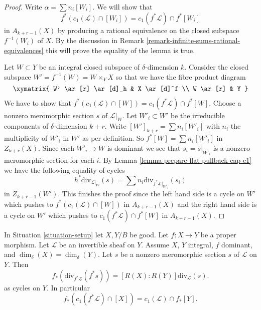\begin{proof}
Write $\alpha = \sum n_i[W_i]$. We will show that
$$
f^*(c_1(\mathcal{L}) \cap [W_i]) = c_1(f^*\mathcal{L}) \cap f^*[W_i]
$$
in $A_{k + r - 1}(X)$ by producing a rational equivalence
on the closed subspace $f^{-1}(W_i)$ of $X$.
By the discussion in
Remark \ref{remark-infinite-sums-rational-equivalences}
this will prove the equality of the lemma is true.

\medskip\noindent
Let $W \subset Y$ be an integral closed subspace of $\delta$-dimension $k$.
Consider the closed subspace $W' = f^{-1}(W) = W \times_Y X$
so that we have the fibre product diagram
$$
\xymatrix{
W' \ar[r] \ar[d]_h & X \ar[d]^f \\
W \ar[r] & Y
}
$$
We have to show that
$f^*(c_1(\mathcal{L}) \cap [W]) = c_1(f^*\mathcal{L}) \cap f^*[W]$.
Choose a nonzero meromorphic section $s$ of $\mathcal{L}|_W$.
Let $W'_i \subset W'$ be the irreducible components of
$\delta$-dimension $k + r$. Write $[W']_{k + r} = \sum n_i[W'_i]$
with $n_i$ the multiplicity of $W'_i$ in $W'$ as per definition.
So $f^*[W] = \sum n_i[W'_i]$ in $Z_{k + r}(X)$.
Since each $W'_i \to W$ is dominant we
see that $s_i = s|_{W'_i}$ is a nonzero meromorphic section for
each $i$. By Lemma \ref{lemma-prepare-flat-pullback-cap-c1}
we have the following equality of cycles
$$
h^*\text{div}_{\mathcal{L}|_W}(s) =
\sum n_i\text{div}_{f^*\mathcal{L}|_{W'_i}}(s_i)
$$
in $Z_{k + r - 1}(W')$. This finishes the proof since
the left hand side is a cycle on $W'$ which pushes to
$f^*(c_1(\mathcal{L}) \cap [W])$ in $A_{k + r - 1}(X)$
and the right hand side is a cycle on $W'$ which pushes to
$c_1(f^*\mathcal{L}) \cap f^*[W]$ in $A_{k + r - 1}(X)$.
\end{proof}

\begin{lemma}
\label{lemma-equal-c1-as-cycles}
In Situation \ref{situation-setup} let $X, Y/B$ be good.
Let $f : X \to Y$ be a proper morphism.
Let $\mathcal{L}$ be an invertible sheaf on $Y$.
Assume $X$, $Y$ integral, $f$ dominant, and $\dim_\delta(X) = \dim_\delta(Y)$.
Let $s$ be a nonzero meromorphic section $s$ of $\mathcal{L}$ on $Y$.
Then
$$
f_*\left(\text{div}_{f^*\mathcal{L}}(f^*s)\right) =
[R(X) : R(Y)]\text{div}_\mathcal{L}(s).
$$
as cycles on $Y$. In particular
$$
f_*(c_1(f^*\mathcal{L}) \cap [X]) = c_1(\mathcal{L}) \cap f_*[Y].
$$
\end{lemma}

